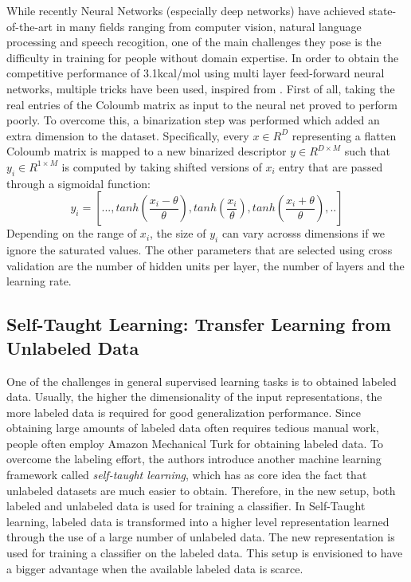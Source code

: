\documentclass[10pt,journal,a4paper]{IEEEtran}
\begin{document}
While recently Neural Networks (especially deep networks) have achieved state-of-the-art in many fields ranging from computer vision, natural language processing and speech recogition, one of the main challenges they pose is the difficulty in training for people without domain expertise. 
In order to obtain the competitive performance of 3.1kcal/mol using multi layer feed-forward neural networks, multiple tricks have been used, inspired from \cite{tricks}. First of all, taking the real entries of the Coloumb matrix as input to the neural net proved to perform poorly.
To overcome this, a binarization step was performed which added an extra dimension to the dataset. Specifically, every $x \in R^{D}$ representing a flatten Coloumb matrix is mapped to a new binarized descriptor $y \in R^{D\times M}$ such that $y_i \in R^{1\times M}$ is computed by taking shifted versions of $x_i$ entry that are passed through a sigmoidal function:
\begin{equation}
	y_i = [..., tanh(\frac{x_i - \theta}{\theta}), tanh(\frac{x_i}{\theta}), tanh(\frac{x_i + \theta}{\theta}),..]
\end{equation}
Depending on the range of $x_i$, the size of $y_i$ can vary acrosss dimensions if we ignore the saturated values.
The other parameters that are selected using cross validation are the number of hidden units per layer, the number of layers and the learning rate.

\subsection{Self-Taught Learning: Transfer Learning from Unlabeled Data}
 
One of the challenges in general supervised learning tasks is to obtained labeled data. Usually, the higher the dimensionality of the input representations, the more labeled data is required for good generalization performance. Since obtaining large amounts of labeled data often requires tedious manual work, people often employ Amazon Mechanical Turk for obtaining labeled data. To overcome the labeling effort, the authors introduce another machine learning framework called \textit{self-taught learning}, which has as core idea the fact that unlabeled datasets are much easier to obtain. Therefore, in the new setup, both labeled and unlabeled data is used for training a classifier. In Self-Taught learning, labeled data is transformed into a higher level representation learned through the use of a large number of unlabeled data. The new representation  is used for training a classifier on the labeled data. This setup is envisioned to have a bigger advantage when the available labeled data is scarce. 
\end{document}
